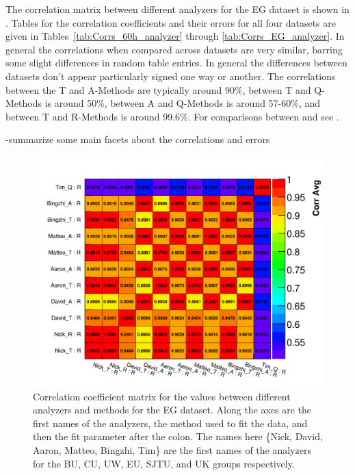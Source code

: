 The correlation matrix between different analyzers for the EG dataset is shown in . Tables for the correlation coefficients and their errors for all four datasets are given in Tables~\ref{tab:Corrs_60h_analyzer} through \ref{tab:Corrs_EG_analyzer}. In general the correlations when compared across datasets are very similar, barring some slight differences in random table entries. In general the differences between datasets don't appear particularly signed one way or another. The correlations between the T and A-Methods are typically around 90\%, between T and Q-Methods is around 50\%, between A and Q-Methods is around 57-60\%, and between T and R-Methods is around 99.6\%. For comparisons between \RE and \RW see .


-summarize some main facets about the correlations and errors



\begin{figure}[]
\centering
\includegraphics[width=\textwidth]{Avg_CorrelationMatrix_R_R}
\caption{Correlation coefficient matrix for the \R values between different analyzers and methods for the EG dataset. Along the axes are the first names of the analyzers, the method used to fit the data, and then the fit parameter after the colon. The names here \{Nick, David, Aaron, Matteo, Bingzhi, Tim\} are the first names of the analyzers for the BU, CU, UW, EU, SJTU, and UK groups respectively.}
\label{fig:corrMatAnalyzer}
\end{figure}


